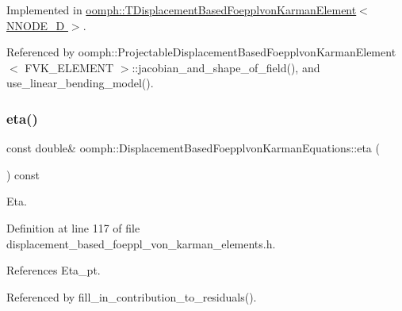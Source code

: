 Implemented in \hyperlink{classoomph_1_1TDisplacementBasedFoepplvonKarmanElement_a1df4d4f099c7a710a1c43004266e4ea7}{oomph\+::\+T\+Displacement\+Based\+Foepplvon\+Karman\+Element$<$ N\+N\+O\+D\+E\+\_\+D $>$}.



Referenced by oomph\+::\+Projectable\+Displacement\+Based\+Foepplvon\+Karman\+Element$<$ F\+V\+K\+\_\+\+E\+L\+E\+M\+E\+N\+T $>$\+::jacobian\+\_\+and\+\_\+shape\+\_\+of\+\_\+field(), and use\+\_\+linear\+\_\+bending\+\_\+model().

\mbox{\label{classoomph_1_1DisplacementBasedFoepplvonKarmanEquations_ad8e7978589f1ddf2de86510969288f57}} 
\subsubsection{\texorpdfstring{eta()}{eta()}}
{\footnotesize\ttfamily const double\& oomph\+::\+Displacement\+Based\+Foepplvon\+Karman\+Equations\+::eta (\begin{DoxyParamCaption}{ }\end{DoxyParamCaption}) const\hspace{0.3cm}{\ttfamily [inline]}}



Eta. 



Definition at line 117 of file displacement\+\_\+based\+\_\+foeppl\+\_\+von\+\_\+karman\+\_\+elements.\+h.



References Eta\+\_\+pt.



Referenced by fill\+\_\+in\+\_\+contribution\+\_\+to\+\_\+residuals().

\mbox{\label{classoomph_1_1DisplacementBasedFoepplvonKarmanEquations_ab1d473f22df694550ded35e1879db49e}} 

